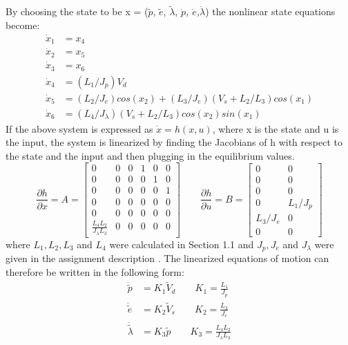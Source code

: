 %
By choosing the state to be x = ($\tilde{p}$, $\tilde{e}$,
$\tilde{\lambda}$, \textit{$\dot{p}$, $\dot{e}$,$\dot{\lambda}$}) the
nonlinear state equations become:
%
\begin{subequations}
  \label{eq:full state equations}
  \begin{align}
    \dot{x}_1 &= x_4 \\
    \dot{x}_2 &= x_5 \\
    \dot{x}_3 &= x_6 \\
    \dot{x}_4 &= (L_1/J_p) V_d \\
    \dot{x}_5 &= (L_2/J_e)cos(x_2) + (L_3/J_e)(V_s + L_2 / L_3)cos(x_1) \\
    \dot{x}_6 &= (L_4 / J_\lambda) (V_s + L_2 / L_3)cos(x_2)sin(x_1)
  \end{align}
\end{subequations}
If the above system is expressed as $\dot{x} = h(x, u)$, where x is
the state and u is the input, the system is linearized by finding the
Jacobians of h with respect to the state and the input and then
plugging in the equilibrium values.
%
\begin{equation}
  \label{eq:Linearized Jacobians}
  \frac{\partial h}{\partial x} = A =
  \begin{bmatrix}
    0 & 0 & 0 & 1 & 0 & 0 \\
    0 & 0 & 0 & 0 & 1 & 0 \\
    0 & 0 & 0 & 0 & 0 & 1 \\
    0 & 0 & 0 & 0 & 0 & 0 \\
    0 & 0 & 0 & 0 & 0 & 0 \\
    \frac{L_4L_2}{J_\lambda L_3} & 0 & 0 & 0 & 0 & 0
  \end{bmatrix}
  \qquad
  \frac{\partial h}{\partial u} = B =
  \begin{bmatrix}
    0 & 0 \\
    0 & 0 \\
    0 & 0 \\
    0 & L_1/J_p \\
    L_3/J_e & 0 \\
    0 & 0
  \end{bmatrix}
\end{equation}
where $L_1, L_2, L_3$ and $L_4$ were calculated in Section 1.1 and
$J_p, J_e$ and $J_\lambda$ were given in the assignment description
\cite[p.14]{assignment}.
%
The linearized equations of motion can therefore be written in the
following form:
%
\begin{subequations}
  \label{eq:linearized EoM}
  \begin{align}
    \ddot{\tilde{p}} &=
    K_1\tilde{V}_d \qquad K_1 = \frac{L_1}{J_p}
    \label{eq:linearized pitch EoM}\\
    \ddot{\tilde{e}} &=
    K_2\tilde{V}_s \qquad K_2 = \frac{L_3}{J_e}
    \label{eq:linearized elevation EoM}\\
    \ddot{\tilde{\lambda}} &=
    K_3\tilde{p} \qquad K_3 = \frac{L_4L_2}{J_\lambda L_3}
    \label{eq:linearized travel EoM}
  \end{align}
\end{subequations}

